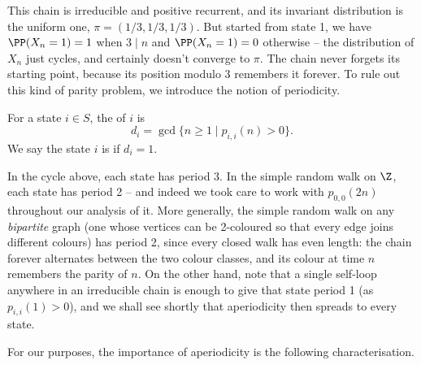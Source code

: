 This chain is irreducible and positive recurrent, and its invariant distribution is the uniform one, $\pi = (1/3, 1/3, 1/3)$. But started from state 1, we have $\PP(X_n = 1) = 1$ when $3 \mid n$ and $\PP(X_n = 1) = 0$ otherwise -- the distribution of $X_n$ just cycles, and certainly doesn't converge to $\pi$. The chain never forgets its starting point, because its position modulo 3 remembers it forever. To rule out this kind of parity problem, we introduce the notion of periodicity.

\begin{definition}[Period]
	For a state $i \in S$, the  of $i$ is
	$$
	d_i = \gcd\{n \geq 1 \mid p_{i, i}(n) > 0\}.
	$$
	We say the state $i$ is  if $d_i = 1$.
\end{definition}

In the cycle above, each state has period 3. In the simple random walk on $\Z$, each state has period 2 -- and indeed we took care to work with $p_{0,0}(2n)$ throughout our analysis of it. More generally, the simple random walk on any \emph{bipartite} graph (one whose vertices can be 2-coloured so that every edge joins different colours) has period 2, since every closed walk has even length: the chain forever alternates between the two colour classes, and its colour at time $n$ remembers the parity of $n$. On the other hand, note that a single self-loop anywhere in an irreducible chain is enough to give that state period 1 (as $p_{i,i}(1) > 0$), and we shall see shortly that aperiodicity then spreads to every state.

For our purposes, the importance of aperiodicity is the following characterisation.

